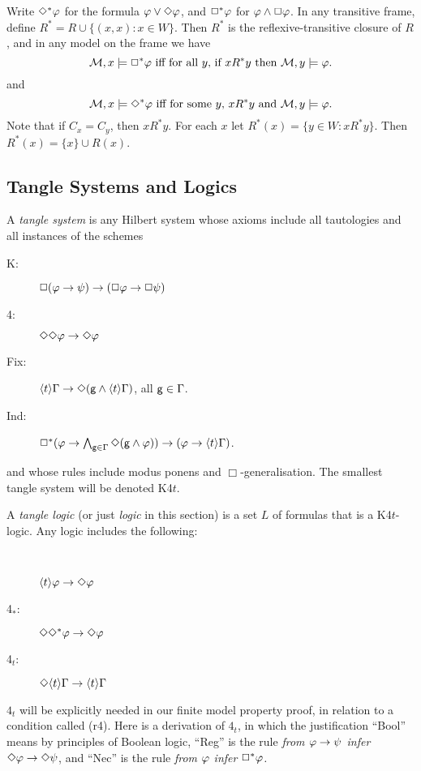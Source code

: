 Write $\Diamond^*\varphi$ for the formula $\varphi\lor\Diamond\varphi$, and  $\Box^*\varphi$ for $\varphi\land\Box\varphi$. In any transitive frame, define  $R^*=R\cup\{(x,x):x\in W\}$. Then $R^*$ is the reflexive-transitive closure of $R$, and in any model on the frame we have
 \begin{equation*}\label{}
 \text{$\M,x\models\Box^*\ph$ iff for all $y$,  if $xR^*y$ then $\M,y\models \ph$.}
 \end{equation*} 
and
 \begin{equation*}\label{}
 \text{$\M,x\models\Dim^*\ph$ iff for some $y$,  $xR^*y$ and $\M,y\models \ph$.}
 \end{equation*} 
Note that if $C_x=C_y$, then $xR^*y$. For each $x$ let $R^*(x)=\{y\in W:xR^*y\}$. Then $R^*(x)=\{x\}\cup R(x)$.







\subsection{Tangle Systems and Logics}\label{ss:tangle logics}

A \emph{tangle system}  is any Hilbert system whose axioms
 include all tautologies and all instances of the schemes
\begin{description}
\item[K:]
$\Box(\varphi\to\psi)\to(\Box\varphi\to\Box\psi)$
\item[4:]
 $\Diamond\Diamond\varphi\to\Diamond\varphi$
\item[Fix:]
$\langle t\rangle\Gamma\to  \Diamond({\sf g}\land\langle t\rangle\Gamma)$, \quad all ${\sf g}\in\Gamma$.
\item[Ind:]
$\Box^*(\varphi\to \bigwedge_{{\sf g}\in\Gamma}\Diamond({\sf g}\land\varphi))\to(\varphi\to\langle t\rangle\Gamma)$.
\end{description}
%
and whose rules include  modus ponens and $\Box$-generalisation. The smallest tangle system will be denoted K4$t$.

A \emph{tangle logic} (or just \emph{logic} in this section) is a set $L$ of formulas 
that is a K4$t$-logic.
Any logic includes the following:

\begin{description}
\item[\ ]
\quad$\langle t\rangle\varphi\to\Diamond\varphi$
\item[4$_*$: ] 
$\Diamond\Diamond^*\varphi\to\Diamond\varphi$
\item[4$_t$: ] 
$\Diamond\langle t\rangle\Gamma\to\langle t\rangle\Gamma$
\end{description}
$4_t$ will be explicitly needed in our finite model property proof, in relation to a condition  called (r4).
Here is a derivation of $4_t$, in which the justification ``Bool'' means by principles of Boolean logic, ``Reg'' is the rule \emph{from $\varphi\to\psi$ infer $\Diamond\varphi\to\Diamond\psi$}, and ``Nec'' is the rule \emph{from $\varphi$ infer $\Box^*\varphi$.}

